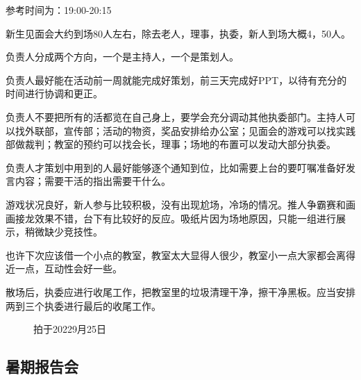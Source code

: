 \documentclass{ctexbook}
\begin{document}
参考时间为：19:00-20:15

新生见面会大约到场80人左右，除去老人，理事，执委，新人到场大概4，50人。

负责人分成两个方向，一个是主持人，一个是策划人。

负责人最好能在活动前一周就能完成好策划，前三天完成好PPT，以待有充分的时间进行协调和更正。

负责人不要把所有的活都览在自己身上，要学会充分调动其他执委部门。主持人可以找外联部，宣传部；活动的物资，奖品安排给办公室；见面会的游戏可以找实践部做裁判；教室的预约可以找会长，理事；场地的布置可以发动大部分执委。

负责人才策划中用到的人最好能够逐个通知到位，比如需要上台的要叮嘱准备好发言内容；需要干活的指出需要干什么。

游戏状况良好，新人参与比较积极，没有出现尬场，冷场的情况。推人争霸赛和画画接龙效果不错，台下有比较好的反应。吸纸片因为场地原因，只能一组进行展示，稍微缺少竞技性。

也许下次应该借一个小点的教室，教室太大显得人很少，教室小一点大家都会离得近一点，互动性会好一些。

散场后，执委应进行收尾工作，把教室里的垃圾清理干净，擦干净黑板。应当安排两到三个执委进行最后的收尾工作。

\begin{figure}[!htb]
    \centering
       \quad 
        \caption{拍于20229月25日}
  \end{figure}


\subsection{暑期报告会}
\end{document}
